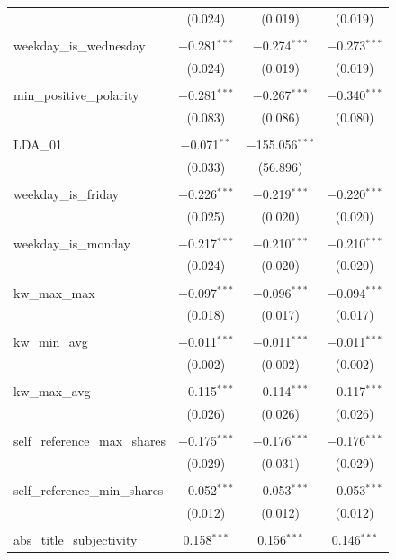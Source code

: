 \begin{table}[!htbp]
\begin{tabular}{@{\extracolsep{5pt}}lccc}
  & (0.024) & (0.019) & (0.019) \\ 
  & & & \\ 
 weekday\_is\_wednesday & $-$0.281$^{***}$ & $-$0.274$^{***}$ & $-$0.273$^{***}$ \\ 
  & (0.024) & (0.019) & (0.019) \\ 
  & & & \\ 
 min\_positive\_polarity & $-$0.281$^{***}$ & $-$0.267$^{***}$ & $-$0.340$^{***}$ \\ 
  & (0.083) & (0.086) & (0.080) \\ 
  & & & \\ 
 LDA\_01 & $-$0.071$^{**}$ & $-$155.056$^{***}$ &  \\ 
  & (0.033) & (56.896) &  \\ 
  & & & \\ 
 weekday\_is\_friday & $-$0.226$^{***}$ & $-$0.219$^{***}$ & $-$0.220$^{***}$ \\ 
  & (0.025) & (0.020) & (0.020) \\ 
  & & & \\ 
 weekday\_is\_monday & $-$0.217$^{***}$ & $-$0.210$^{***}$ & $-$0.210$^{***}$ \\ 
  & (0.024) & (0.020) & (0.020) \\ 
  & & & \\ 
 kw\_max\_max & $-$0.097$^{***}$ & $-$0.096$^{***}$ & $-$0.094$^{***}$ \\ 
  & (0.018) & (0.017) & (0.017) \\ 
  & & & \\ 
 kw\_min\_avg & $-$0.011$^{***}$ & $-$0.011$^{***}$ & $-$0.011$^{***}$ \\ 
  & (0.002) & (0.002) & (0.002) \\ 
  & & & \\ 
 kw\_max\_avg & $-$0.115$^{***}$ & $-$0.114$^{***}$ & $-$0.117$^{***}$ \\ 
  & (0.026) & (0.026) & (0.026) \\ 
  & & & \\ 
 self\_reference\_max\_shares & $-$0.175$^{***}$ & $-$0.176$^{***}$ & $-$0.176$^{***}$ \\ 
  & (0.029) & (0.031) & (0.029) \\ 
  & & & \\ 
 self\_reference\_min\_shares & $-$0.052$^{***}$ & $-$0.053$^{***}$ & $-$0.053$^{***}$ \\ 
  & (0.012) & (0.012) & (0.012) \\ 
  & & & \\ 
 abs\_title\_subjectivity & 0.158$^{***}$ & 0.156$^{***}$ & 0.146$^{***}$ \\ 

\end{tabular}
\end{table}
